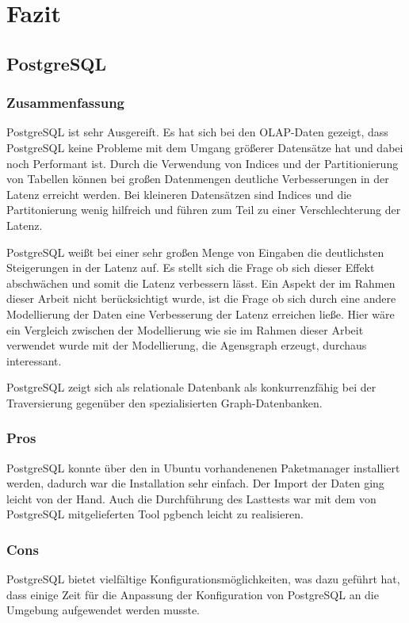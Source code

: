 \chapter{Fazit}
\section{PostgreSQL}
\subsection{Zusammenfassung}
PostgreSQL ist sehr Ausgereift. Es hat sich bei den OLAP-Daten gezeigt, dass PostgreSQL keine Probleme mit dem Umgang größerer Datensätze hat und dabei noch Performant ist. Durch die Verwendung von Indices und der Partitionierung von Tabellen können bei großen Datenmengen deutliche Verbesserungen in der Latenz erreicht werden. Bei kleineren Datensätzen sind Indices und die Partitonierung wenig hilfreich und führen zum Teil zu einer Verschlechterung der Latenz.

PostgreSQL weißt bei einer sehr großen Menge von Eingaben die deutlichsten Steigerungen in der Latenz auf. Es stellt sich die Frage ob sich dieser Effekt abschwächen und somit die Latenz verbessern lässt.
Ein Aspekt der im Rahmen dieser Arbeit nicht berücksichtigt wurde, ist die Frage ob sich durch eine andere Modellierung der Daten eine Verbesserung der Latenz erreichen ließe. Hier wäre ein Vergleich zwischen der Modellierung wie sie im Rahmen dieser Arbeit verwendet wurde mit der Modellierung, die Agensgraph erzeugt, durchaus interessant. 

PostgreSQL zeigt sich als relationale Datenbank als konkurrenzfähig bei der Traversierung gegenüber den spezialisierten Graph-Datenbanken.

\subsection{Pros}
PostgreSQL konnte über den in Ubuntu vorhandenenen Paketmanager installiert werden, dadurch war die Installation sehr einfach. Der Import der Daten ging leicht von der Hand. Auch die Durchführung des Lasttests war mit dem von PostgreSQL mitgelieferten Tool pgbench leicht zu realisieren.  

\subsection{Cons}

PostgreSQL bietet vielfältige Konfigurationsmöglichkeiten, was dazu geführt hat, dass einige Zeit für die Anpassung der Konfiguration von PostgreSQL an die Umgebung aufgewendet werden musste.